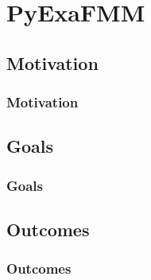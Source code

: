 \section{PyExaFMM}

\subsection{Motivation}
\begin{frame}
    \frametitle{Motivation}
\end{frame}

\subsection{Goals}
\begin{frame}
    \frametitle{Goals}
\end{frame}

\subsection{Outcomes}
\begin{frame}
    \frametitle{Outcomes}
\end{frame}
